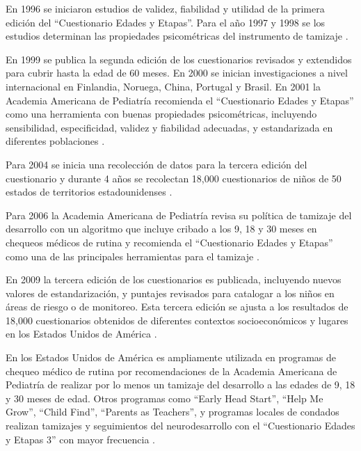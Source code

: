 En 1996 se iniciaron estudios de validez, fiabilidad y utilidad de la primera
edición del ``Cuestionario Edades y Etapas''. Para el año 1997 y 1998 se los
estudios determinan las propiedades psicométricas del instrumento de tamizaje
\cite{ASQ4decades}.

En 1999 se publica la segunda edición de los cuestionarios revisados y
extendidos para cubrir hasta la edad de 60 meses. En 2000 se inician
investigaciones a nivel internacional en Finlandia, Noruega, China, Portugal y
Brasil. En 2001 la Academia Americana de Pediatría recomienda el ``Cuestionario
Edades y Etapas'' como una herramienta con buenas propiedades psicométricas,
incluyendo sensibilidad, especificidad, validez y fiabilidad adecuadas, y
estandarizada en diferentes poblaciones \cite{Pediatrics2001}.

Para 2004 se inicia una recolección de datos para la tercera edición del
cuestionario y durante 4 años se recolectan 18,000 cuestionarios de niños de 50
estados de territorios estadounidenses \cite{ASQ4decades}.

Para 2006 la Academia Americana de Pediatría revisa su política de tamizaje del
desarrollo con un algoritmo que incluye cribado a los 9, 18 y 30 meses en
chequeos médicos de rutina y recomienda el ``Cuestionario Edades y Etapas''
como una de las principales herramientas para el tamizaje \cite{Pediatrics2006}.
 
En 2009 la tercera edición de los cuestionarios es publicada, incluyendo nuevos
valores de estandarización, y puntajes revisados para catalogar a los niños en
áreas de riesgo o de monitoreo. Esta tercera edición se ajusta a los resultados
de 18,000 cuestionarios obtenidos de diferentes contextos socioeconómicos y
lugares en los Estados Unidos de América \cite{ASQ4decades}.

En los Estados Unidos de América es ampliamente utilizada en programas de
chequeo médico de rutina por recomendaciones de la Academia Americana de
Pediatría de realizar por lo menos un tamizaje del desarrollo a las edades de
9, 18 y 30 meses de edad. Otros programas como ``Early Head Start'', ``Help Me
Grow'', ``Child Find'', ``Parents as Teachers'', y programas locales de
condados realizan tamizajes y seguimientos del neurodesarrollo con el
``Cuestionario Edades y Etapas 3'' con mayor frecuencia \cite{ASQWorld}.

